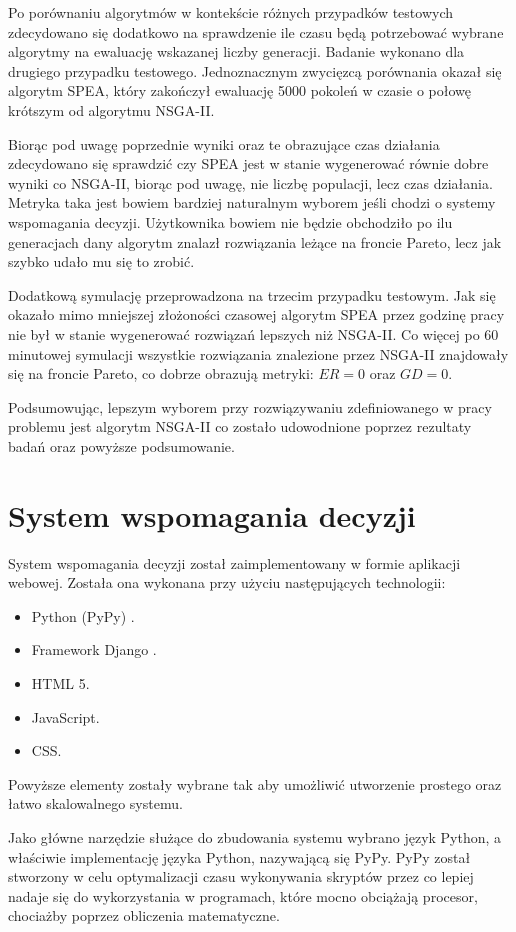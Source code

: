 \documentclass[twoside]{iisthesis}
\begin{document}
Po porównaniu algorytmów w kontekście różnych przypadków testowych zdecydowano się dodatkowo na sprawdzenie ile czasu będą potrzebować wybrane algorytmy na ewaluację wskazanej liczby generacji. Badanie wykonano dla drugiego przypadku testowego. Jednoznacznym zwycięzcą porównania okazał się algorytm SPEA, który zakończył ewaluację 5000 pokoleń w czasie o połowę krótszym od algorytmu NSGA-II.

Biorąc pod uwagę poprzednie wyniki oraz te obrazujące czas działania zdecydowano się sprawdzić czy SPEA jest w stanie wygenerować równie dobre wyniki co NSGA-II, biorąc pod uwagę, nie liczbę populacji, lecz czas działania. Metryka taka jest bowiem bardziej naturalnym wyborem jeśli chodzi o systemy wspomagania decyzji. Użytkownika bowiem nie będzie obchodziło po ilu generacjach dany algorytm znalazł rozwiązania leżące na froncie Pareto, lecz jak szybko udało mu się to zrobić.

Dodatkową symulację przeprowadzona na trzecim przypadku testowym. Jak się okazało mimo mniejszej złożoności czasowej algorytm SPEA przez godzinę pracy nie był w stanie wygenerować rozwiązań lepszych niż NSGA-II. Co więcej po 60 minutowej symulacji wszystkie rozwiązania znalezione przez NSGA-II znajdowały się na froncie Pareto, co dobrze obrazują metryki: $ER=0$ oraz $GD=0$.

Podsumowując, lepszym wyborem przy rozwiązywaniu zdefiniowanego w pracy problemu jest algorytm NSGA-II co zostało udowodnione poprzez rezultaty badań oraz powyższe podsumowanie.
\section{System wspomagania decyzji}
System wspomagania decyzji został zaimplementowany w formie aplikacji webowej. Została ona wykonana przy użyciu następujących technologii:\\
\begin{itemize}
	\item Python (PyPy) \cite{pypy}.
	\item Framework Django \cite{django}.
	\item HTML 5.
	\item JavaScript.
	\item CSS.\\
\end{itemize}

Powyższe elementy zostały wybrane tak aby umożliwić utworzenie prostego oraz łatwo skalowalnego systemu.

Jako główne narzędzie służące do zbudowania systemu wybrano język Python, a właściwie implementację języka Python, nazywającą się PyPy. PyPy został stworzony w celu optymalizacji czasu wykonywania skryptów przez co lepiej nadaje się do wykorzystania w programach, które mocno obciążają procesor, chociażby poprzez obliczenia matematyczne.
\end{document}
